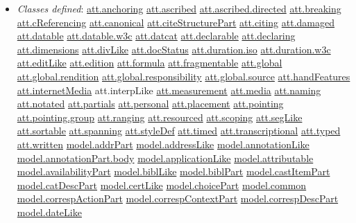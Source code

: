 \begin{description}
\begin{itemize}
\item {\itshape Classes defined}: \hyperref[TEI.att.anchoring]{att.anchoring} \hyperref[TEI.att.ascribed]{att.ascribed} \hyperref[TEI.att.ascribed.directed]{att.ascribed.directed} \hyperref[TEI.att.breaking]{att.breaking} \hyperref[TEI.att.cReferencing]{att.cReferencing} \hyperref[TEI.att.canonical]{att.canonical} \hyperref[TEI.att.citeStructurePart]{att.citeStructurePart} \hyperref[TEI.att.citing]{att.citing} \hyperref[TEI.att.damaged]{att.damaged} \hyperref[TEI.att.datable]{att.datable} \hyperref[TEI.att.datable.w3c]{att.datable.w3c} \hyperref[TEI.att.datcat]{att.datcat} \hyperref[TEI.att.declarable]{att.declarable} \hyperref[TEI.att.declaring]{att.declaring} \hyperref[TEI.att.dimensions]{att.dimensions} \hyperref[TEI.att.divLike]{att.divLike} \hyperref[TEI.att.docStatus]{att.docStatus} \hyperref[TEI.att.duration.iso]{att.duration.iso} \hyperref[TEI.att.duration.w3c]{att.duration.w3c} \hyperref[TEI.att.editLike]{att.editLike} \hyperref[TEI.att.edition]{att.edition} \hyperref[TEI.att.formula]{att.formula} \hyperref[TEI.att.fragmentable]{att.fragmentable} \hyperref[TEI.att.global]{att.global} \hyperref[TEI.att.global.rendition]{att.global.rendition} \hyperref[TEI.att.global.responsibility]{att.global.responsibility} \hyperref[TEI.att.global.source]{att.global.source} \hyperref[TEI.att.handFeatures]{att.handFeatures} \hyperref[TEI.att.internetMedia]{att.internetMedia} att.interpLike \hyperref[TEI.att.measurement]{att.measurement} \hyperref[TEI.att.media]{att.media} \hyperref[TEI.att.naming]{att.naming} \hyperref[TEI.att.notated]{att.notated} \hyperref[TEI.att.partials]{att.partials} \hyperref[TEI.att.personal]{att.personal} \hyperref[TEI.att.placement]{att.placement} \hyperref[TEI.att.pointing]{att.pointing} \hyperref[TEI.att.pointing.group]{att.pointing.group} \hyperref[TEI.att.ranging]{att.ranging} \hyperref[TEI.att.resourced]{att.resourced} \hyperref[TEI.att.scoping]{att.scoping} \hyperref[TEI.att.segLike]{att.segLike} \hyperref[TEI.att.sortable]{att.sortable} \hyperref[TEI.att.spanning]{att.spanning} \hyperref[TEI.att.styleDef]{att.styleDef} \hyperref[TEI.att.timed]{att.timed} \hyperref[TEI.att.transcriptional]{att.transcriptional} \hyperref[TEI.att.typed]{att.typed} \hyperref[TEI.att.written]{att.written} \hyperref[TEI.model.addrPart]{model.addrPart} \hyperref[TEI.model.addressLike]{model.addressLike} \hyperref[TEI.model.annotationLike]{model.annotationLike} \hyperref[TEI.model.annotationPart.body]{model.annotationPart.body} \hyperref[TEI.model.applicationLike]{model.applicationLike} \hyperref[TEI.model.attributable]{model.attributable} \hyperref[TEI.model.availabilityPart]{model.availabilityPart} \hyperref[TEI.model.biblLike]{model.biblLike} \hyperref[TEI.model.biblPart]{model.biblPart} \hyperref[TEI.model.castItemPart]{model.castItemPart} \hyperref[TEI.model.catDescPart]{model.catDescPart} \hyperref[TEI.model.certLike]{model.certLike} \hyperref[TEI.model.choicePart]{model.choicePart} \hyperref[TEI.model.common]{model.common} \hyperref[TEI.model.correspActionPart]{model.correspActionPart} \hyperref[TEI.model.correspContextPart]{model.correspContextPart} \hyperref[TEI.model.correspDescPart]{model.correspDescPart} \hyperref[TEI.model.dateLike]{model.dateLike} 
\end{itemize}
\end{description}
